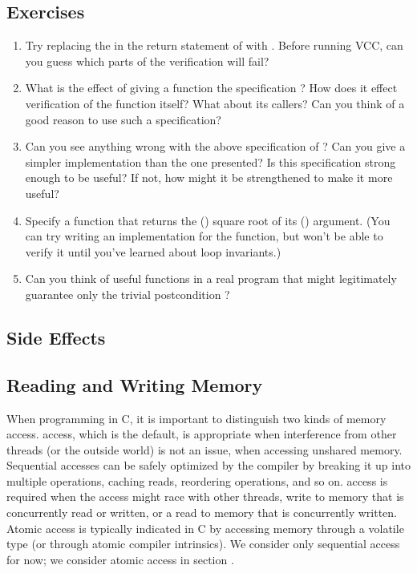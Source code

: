 \subsection*{Exercises}
\begin{enumerate}
\item
Try replacing the \vcc{<} in the return statement of  with
\vcc{>}. Before running VCC, can you guess which parts of the
verification will fail?

\item
What is the effect of giving a function the specification
? How does it effect verification of
the function itself? What about its callers? Can you think of a good 
reason to use such a specification?

\item
Can you see anything wrong with the above specification of ?
Can you give a simpler implementation than the one presented? Is this 
specification strong enough to be useful? If not, how might it be
strengthened to make it more useful?

\item
Specify a function that returns the () square root of its ()
argument. (You can try writing an implementation for the function, but
won't be able to verify it until you've learned about loop
invariants.)

\item
Can you think of useful functions in a real program that might
legitimately guarantee only the trivial postcondition ?
\end{enumerate}

\subsection{Side Effects}

\subsection{Reading and Writing Memory}
\label{sect:writes}

When programming in C, it is important to distinguish two kinds of
memory access.  access, which is the default, is appropriate when
interference from other threads (or the outside world) is not an
issue, \eg when accessing unshared memory. Sequential accesses can be
safely optimized by the compiler by breaking it up into multiple
operations, caching reads, reordering operations, and so on. 
 access is required when the access might race with other
threads, \ie write to memory that is concurrently read or written,
or a read to memory that is concurrently written. Atomic access is typically
indicated in C by accessing memory through a volatile type (or through atomic 
compiler intrinsics). We consider only sequential 
access for now; we consider atomic access in section .

